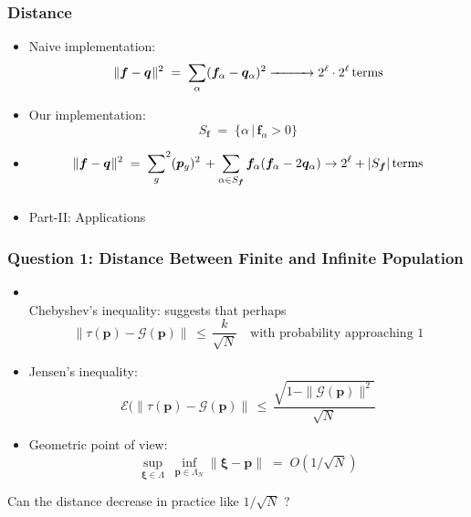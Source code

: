 \documentclass[aspectratio=169]{beamer}
\begin{document}
  \begin{frame}
    \frametitle{Distance}
    \begin{itemize}      
      \item{Naive implementation: 
      \[
	\|{\bm f} - {\bm q} \hspace{0.005in} \|^2 \; = \;
	  {\sum_{\alpha}} ({\bm f}_\alpha-{\bm q}_\alpha)^2 
	   \xrightarrow{\hspace*{1cm}} 2^\ell \cdot 2^\ell \, \text{terms} 
	\]
      }      
      \item{Our implementation:
	\[
	    S_{\bm f} \; = \; \{ \alpha \, | \, {\bm f}_\alpha > 0 \}
	\]
      }
      \item{
	\begin{equation*}
	  \|{\bm f} - {\bm q} \hspace{0.005in} \|^2 \; = \; {\sum_{g}}^2 ({\bm p}_{g})^2 \, +
	  \sum_{\alpha \in {S_{\bm f}}} {\bm f}_\alpha ({\bm f}_\alpha- 2 {\bm q}_\alpha) \to 2^\ell + |S_{\bm f}| \, \text{terms} 
	\end{equation*}
      }      
    \end{itemize}
  \end{frame}
  
  \begin{frame}
    \frametitle{}
    \begin{itemize}
      \item Part-II: Applications
      \end{itemize}
  \end{frame}
  
   \begin{frame}
    \frametitle{Question 1: Distance Between Finite and Infinite Population}
    {
    \begin{itemize}
      \item{\mbox{}\\[-0.5 in] 
      Chebyshev's inequality: suggests that perhaps
      \[ 
	\| \tau (\bm{p}) - \mathcal{G}(\bm{p}) \| \,\leq\, \frac{k}{\sqrt{N}}  \quad \text{with probability approaching 1}
      \]       
      }
      \item{Jensen's inequality: 
       \[ \mathcal{E}(\| \tau (\bm{p}) - \mathcal{G}(\bm{p}) \| \,\leq\, \frac{\sqrt{1 - \|\mathcal{G}(\bm{p})\|^2}}{\sqrt{N}}\]}
      \item{Geometric point of view: \[ \sup_{\bm{\xi} \in \Lambda} \; \inf_{\bm{p} \in \Lambda_N} \|\bm{\xi} - \bm{p}\| \;=\; O(1/\sqrt{N}) \] 	
      }      
    \end{itemize}
    }
    Can the distance decrease in practice like $1/\sqrt{N}$ ?
  \end{frame}
  
\end{document}
